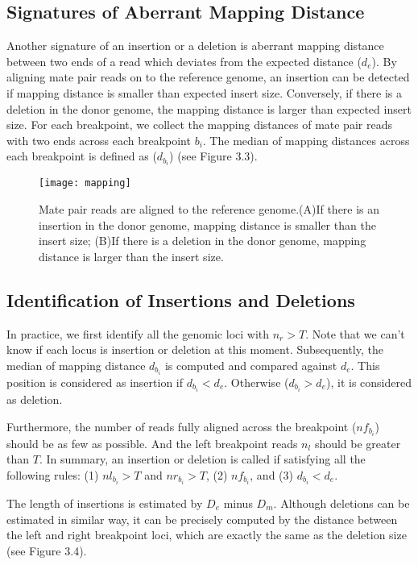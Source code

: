 \subsection{Signatures of Aberrant Mapping Distance}

Another signature of an insertion or a deletion is aberrant mapping distance between two ends of a read which deviates from the expected distance ($d_e$). By aligning mate pair reads on to the reference genome, an insertion can be detected if mapping distance is smaller than expected insert size. Conversely, if there is a deletion in the donor genome, the mapping distance is larger than expected insert size. For each breakpoint, we collect the mapping distances of mate pair reads with two ends across each breakpoint $b_i$. The median of mapping distances across each breakpoint is defined as ($d_{b_i}$) (see Figure 3.3). 


\begin{figure}[ht]
\begin{center}
\texttt{[image: mapping]}
\caption{Mate pair reads are aligned to the reference genome.(A)If there is an insertion in the donor genome, mapping distance is smaller than the insert size; (B)If there is a deletion in the donor genome, mapping distance is larger than the insert size.   }
\label{}
\end{center}
\end{figure}


\subsection{Identification of Insertions and Deletions}

    In practice, we first identify all the genomic loci with $n_r > T$. Note that we can't know if each locus is insertion or deletion at this moment. Subsequently, the median of mapping distance $d_{b_i}$ is computed and compared against $d_e$. This position is considered as insertion if $d_{b_i}<d_e$. Otherwise ($d_{b_i}>d_e$), it is considered as deletion.  

    Furthermore, the number of reads fully aligned across the breakpoint ($nf_{b_i}$) should be as few as possible. And the left breakpoint reads $n_l$ should be greater than $T$. In summary, an insertion or deletion is called if satisfying all the following rules: (1) $nl_{b_i} > T$ and $nr_{b_i} > T$, (2) $nf_{b_i}$, and (3) $d_{b_i} < d_e$. 

    The length of insertions is estimated by $D_e$ minus $D_m$. Although deletions can be estimated in similar way, it can be precisely computed by the distance between the left and right breakpoint loci, which are exactly the same as the deletion size (see Figure 3.4). 


